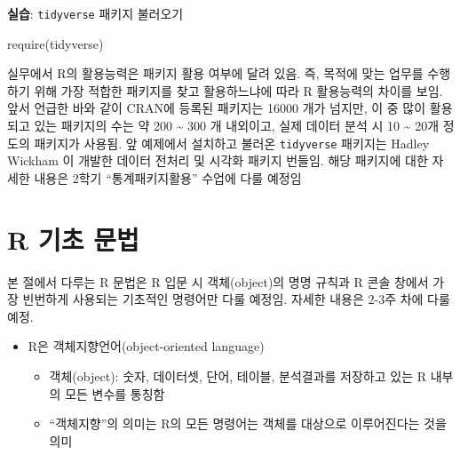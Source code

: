 \documentclass[
  11pt,
]{krantz}
\makeatletter
\newenvironment{Shaded}{\begin{snugshade}}{\end{snugshade}}
\newcommand{\FunctionTok}[1]{\textcolor[rgb]{0,0,0}{#1}}
\newcommand{\NormalTok}[1]{#1}
\providecommand{\tightlist}{%
  \setlength{\itemsep}{0pt}\setlength{\parskip}{0pt}}
\newenvironment{kframe}{%
\medskip{}
\setlength{\fboxsep}{.8em}
 \def\at@end@of@kframe{}%
 \ifinner\ifhmode%
  \def\at@end@of@kframe{\end{minipage}}%
  \begin{minipage}{\columnwidth}%
 \fi\fi%
 \def\FrameCommand##1{\hskip\@totalleftmargin \hskip-\fboxsep
 \colorbox{shadecolor}{##1}\hskip-\fboxsep
     \hskip-\linewidth \hskip-\@totalleftmargin \hskip\columnwidth}%
 \MakeFramed {\advance\hsize-\width
   \@totalleftmargin\z@ \linewidth\hsize
   \@setminipage}}%
 {\par\unskip\endMakeFramed%
 \at@end@of@kframe}
\newenvironment{rmdblock}[1]
  {
  \begin{itemize}
  \renewcommand{\labelitemi}{
    \raisebox{-.7\height}[0pt][0pt]{
      {\setkeys{Gin}{width=3em,keepaspectratio}\texttt{[image: images/\#1]}}
    }
  }
  \setlength{\fboxsep}{1em}
  \begin{kframe}
  \item
  }
  {
  \end{kframe}
  \end{itemize}
  }
\newenvironment{rmdnote}
  {\begin{rmdblock}{note}}
  {\end{rmdblock}}
\newenvironment{rmdimportant}
  {\begin{rmdblock}{important}}
  {\end{rmdblock}}
\makeatother
\begin{document}
\footnotesize

\begin{rmdimportant}
\textbf{실습}: \texttt{tidyverse} 패키지 불러오기
\end{rmdimportant}

\normalsize

\footnotesize

\begin{Shaded}
\begin{Highlighting}[]
\FunctionTok{require}\NormalTok{(tidyverse)}
\end{Highlighting}
\end{Shaded}

\normalsize

\footnotesize

\begin{rmdnote}
실무에서 R의 활용능력은 패키지 활용 여부에 달려 있음. 즉, 목적에 맞는 업무를 수행하기 위해 가장 적합한 패키지를 찾고 활용하느냐에 따라 R 활용능력의 차이를 보임. 앞서 언급한 바와 같이 CRAN에 등록된 패키지는 16000 개가 넘지만, 이 중 많이 활용되고 있는 패키지의 수는 약 200 \textasciitilde{} 300 개 내외이고, 실제 데이터 분석 시 10 \textasciitilde{} 20개 정도의 패키지가 사용됨. 앞 예제에서 설치하고 불러온 \texttt{tidyverse} 패키지는 Hadley Wickham \citep{tidyverse2019}이 개발한 데이터 전처리 및 시각화 패키지 번들임. 해당 패키지에 대한 자세한 내용은 2학기 ``통계패키지활용'' 수업에 다룰 예정임
\end{rmdnote}

\normalsize

\hypertarget{r-basic}{%
\section{R 기초 문법}\label{r-basic}}

\footnotesize

\begin{rmdnote}
본 절에서 다루는 R 문법은 R 입문 시 객체(object)의 명명 규칙과 R 콘솔 창에서 가장 빈번하게 사용되는 기초적인 명령어만 다룰 예정임.
자세한 내용은 2-3주 차에 다룰 예정.
\end{rmdnote}

\normalsize

\begin{itemize}
\tightlist
\item
  R은 객체지향언어(object-oriented language)

  \begin{itemize}
  \tightlist
  \item
    객체(object): 숫자, 데이터셋, 단어, 테이블, 분석결과를 저장하고 있는 R 내부의 모든 변수를 통칭함
  \item
    ``객체지향''의 의미는 R의 모든 명령어는 객체를 대상으로 이루어진다는 것을 의미
  \end{itemize}
\end{itemize}
\end{document}

